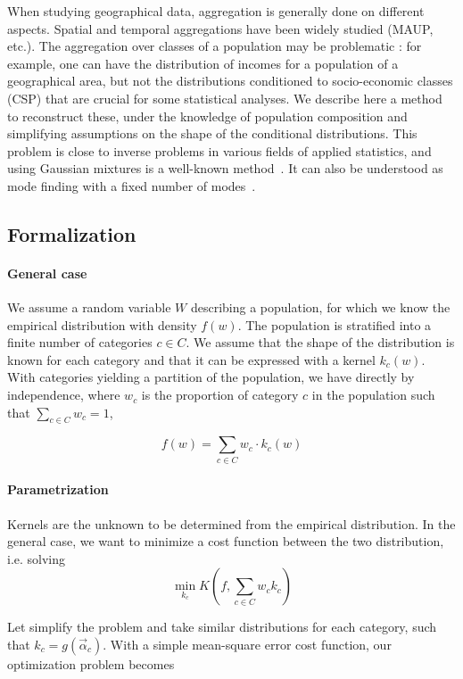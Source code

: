When studying geographical data, aggregation is generally done on different aspects. Spatial and temporal aggregations have been widely studied (MAUP, etc.). The aggregation over classes of a population may be problematic : for example, one can have the distribution of incomes for a population of a geographical area, but not the distributions conditioned to socio-economic classes (CSP) that are crucial for some statistical analyses. We describe here a method to reconstruct these, under the knowledge of population composition and simplifying assumptions on the shape of the conditional distributions. This problem is close to inverse problems in various fields of applied statistics, and using Gaussian mixtures is a well-known method~\cite{yu2012solving}. It can also be understood as mode finding with a fixed number of modes~\cite{carreira2000mode}.


\subsection{Formalization}

\paragraph{General case}

We assume a random variable $W$ describing a population, for which we know the empirical distribution with density $f(w)$. The population is stratified into a finite number of categories $c\in C$. We assume that the shape of the distribution is known for each category and that it can be expressed with a kernel $k_c (w)$. With categories yielding a partition of the population, we have directly by independence, where $w_c$ is the proportion of category $c$ in the population such that $\sum_{c\in C} w_c = 1$,

\[
f(w) = \sum_{c\in C} w_c \cdot k_c (w)
\]

\paragraph{Parametrization}

Kernels are the unknown to be determined from the empirical distribution. In the general case, we want to minimize a cost function between the two distribution, i.e. solving
\[\min_{k_c} K(f,\sum_{c\in C} w_c k_c)\]

Let simplify the problem and take similar distributions for each category, such that $k_c = g(\vec{\alpha}_c)$. With a simple mean-square error cost function, our optimization problem becomes

